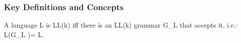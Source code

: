 \subsubsection{Key Definitions and Concepts}
A language L is LL(k) iff there is an LL(k) grammar G_L that accepts it, i.e.: L(G_L )= L.